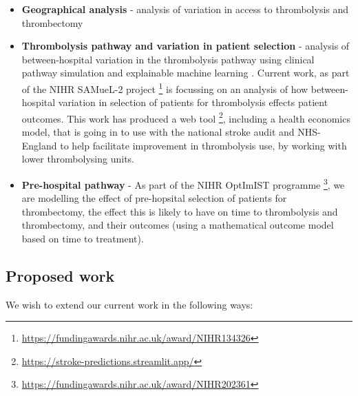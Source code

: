 \begin{itemize}
    \item \textbf{Geographical analysis} - analysis of variation in access to thrombolysis and thrombectomy \cite{allen_maximising_2019}

    \item \textbf{Thrombolysis pathway and variation in patient selection} - analysis of between-hospital variation in the thrombolysis pathway using clinical pathway simulation and explainable machine learning \cite{allen_use_2022, pearn_what_2023}. Current work, as part of the NIHR SAMueL-2 project \footnote{\url{https://fundingawards.nihr.ac.uk/award/NIHR134326}} is focussing on an analysis of how between-hospital variation in selection of patients for thrombolysis effects patient outcomes. This work has produced a web tool \footnote{\url{https://stroke-predictions.streamlit.app/}}, including a health economics model, that is going in to use with the national stroke audit and NHS-England to help facilitate improvement in thrombolysis use, by working with lower thrombolysing units.

    \item \textbf{Pre-hospital pathway} - As part of the NIHR OptImIST programme \footnote{\url{https://fundingawards.nihr.ac.uk/award/NIHR202361}}, we are modelling the effect of pre-hopsital selection of patients for thrombectomy, the effect this is likely to have on time to thrombolysis and thrombectomy, and their outcomes (using a mathematical outcome model based on time to treatment).
    
\end{itemize}

\subsection*{Proposed work}

We wish to extend our current work in the following ways:

